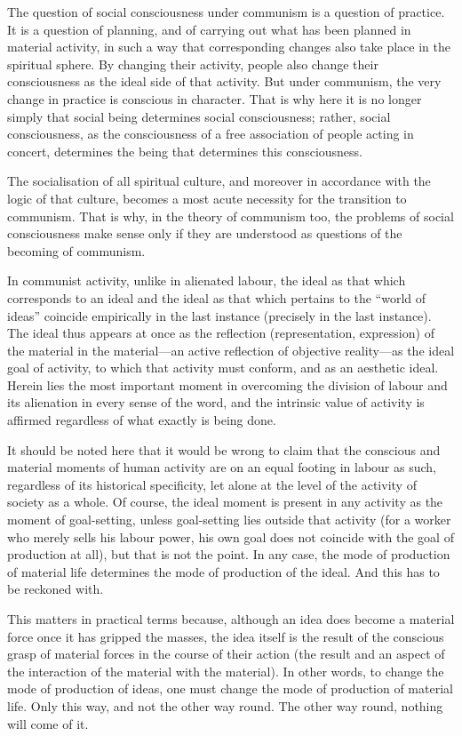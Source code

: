 \documentclass[12pt,a4paper,openany]{book}
\begin{document}
The question of social consciousness under communism is a question of practice. It is a question of planning, and of carrying out what has been planned in material activity, in such a way that corresponding changes also take place in the spiritual sphere. By changing their activity, people also change their consciousness as the ideal side of that activity. But under communism, the very change in practice is conscious in character. That is why here it is no longer simply that social being determines social consciousness; rather, social consciousness, as the consciousness of a free association of people acting in concert, determines the being that determines this consciousness.

The socialisation of all spiritual culture, and moreover in accordance with the logic of that culture, becomes a most acute necessity for the transition to communism. That is why, in the theory of communism too, the problems of social consciousness make sense only if they are understood as questions of the becoming of communism.

In communist activity, unlike in alienated labour, the ideal as that which corresponds to an ideal and the ideal as that which pertains to the “world of ideas” coincide empirically in the last instance (precisely in the last instance). The ideal thus appears at once as the reflection (representation, expression) of the material in the material—an active reflection of objective reality—as the ideal goal of activity, to which that activity must conform, and as an aesthetic ideal. Herein lies the most important moment in overcoming the division of labour and its alienation in every sense of the word, and the intrinsic value of activity is affirmed regardless of what exactly is being done.

It should be noted here that it would be wrong to claim that the conscious and material moments of human activity are on an equal footing in labour as such, regardless of its historical specificity, let alone at the level of the activity of society as a whole. Of course, the ideal moment is present in any activity as the moment of goal-setting, unless goal-setting lies outside that activity (for a worker who merely sells his labour power, his own goal does not coincide with the goal of production at all), but that is not the point. In any case, the mode of production of material life determines the mode of production of the ideal. And this has to be reckoned with.

This matters in practical terms because, although an idea does become a material force once it has gripped the masses, the idea itself is the result of the conscious grasp of material forces in the course of their action (the result and an aspect of the interaction of the material with the material). In other words, to change the mode of production of ideas, one must change the mode of production of material life. Only this way, and not the other way round. The other way round, nothing will come of it.
\end{document}
